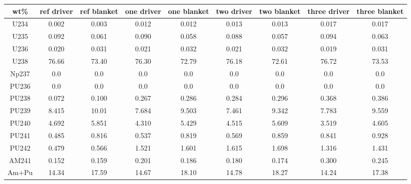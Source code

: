 	\begin{tabular}{ccccccccc}
		\hline
		\textbf{wt\%} & \textbf{ref driver} & \textbf{ref blanket} & \textbf{one driver} & \textbf{one blanket} & \textbf{two driver} & \textbf{two blanket} & \textbf{three driver} & \textbf{three blanket} \\ 		\hline
		U234 & 0.002 & 0.003 & 0.012 & 0.012 & 0.013 & 0.013 & 0.017 & 0.017 \\ 
		U235 & 0.092 & 0.061 & 0.090 & 0.058 & 0.088 & 0.057 & 0.094 & 0.063 \\ 
		U236 & 0.020 & 0.031 & 0.021 & 0.032 & 0.021 & 0.032 & 0.019 & 0.031 \\ 
		U238 & 76.66 & 73.40 & 76.30 & 72.79 & 76.18 & 72.61 & 76.72 & 73.53 \\ 
		Np237 & 0.0 & 0.0 & 0.0 & 0.0 & 0.0 & 0.0 & 0.0 & 0.0 \\ 
		PU236 & 0.0 & 0.0 & 0.0 & 0.0 & 0.0 & 0.0 & 0.0 & 0.0 \\ 
		PU238 & 0.072 & 0.100 & 0.267 & 0.286 & 0.284 & 0.296 & 0.368 & 0.386 \\ 
		PU239 & 8.415 & 10.01 & 7.684 & 9.503 & 7.461 & 9.342 & 7.783 & 9.559 \\ 
		PU240 & 4.692 & 5.851 & 4.310 & 5.429 & 4.515 & 5.609 & 3.519 & 4.605 \\ 
		PU241 & 0.485 & 0.816 & 0.537 & 0.819 & 0.569 & 0.859 & 0.841 & 0.928 \\ 
		PU242 & 0.479 & 0.566 & 1.521 & 1.601 & 1.615 & 1.698 & 1.316 & 1.431 \\ 
		AM241 & 0.152 & 0.159 & 0.201 & 0.186 & 0.180 & 0.174 & 0.300 & 0.245 \\ 
		\hline
		\hline
		Am+Pu & 14.34 & 17.59 & 14.67 & 18.10 & 14.78 & 18.27 & 14.24 & 17.38 \\ 
		\hline 
	\end{tabular} 
